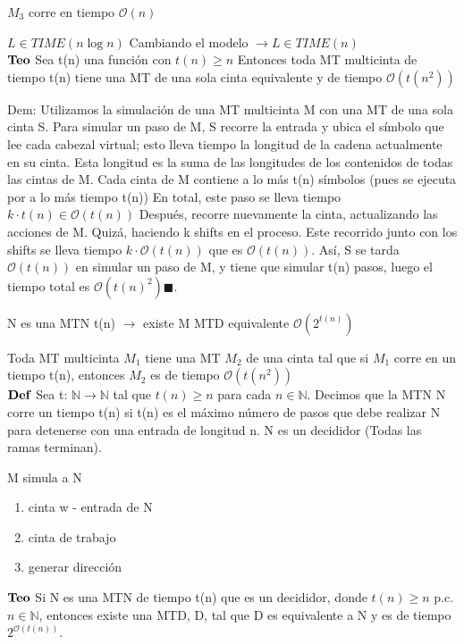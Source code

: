 \documentclass{homework}
\begin{document}
$M_3$ corre en tiempo $\mathcal{O}(n)$

$L \in TIME(n \log{n})$ 
Cambiando el modelo $\rightarrow L \in TIME(n)$\\

$\bf{Teo}$ Sea t(n) una función con $t(n) \geq n$
Entonces toda MT multicinta de tiempo t(n) tiene una MT de una sola cinta equivalente y de tiempo $\mathcal{O}(t(n^2))$

Dem: Utilizamos la simulación de una MT multicinta M con una MT de una sola cinta S.
Para simular un paso de M, S recorre la entrada y ubica el símbolo que lee cada cabezal virtual; esto lleva tiempo la longitud de la cadena actualmente en su cinta. Esta longitud es la suma de las longitudes de los contenidos de todas las cintas de M. Cada cinta de M contiene a lo más t(n) símbolos (pues se ejecuta por a lo más tiempo t(n)) En total, este paso se lleva tiempo $k \cdot t(n) \in \mathcal{O}(t(n))$
Después, recorre nuevamente la cinta, actualizando las acciones de M. Quizá, haciendo k shifts en el proceso. Este recorrido junto con los shifts se lleva tiempo $ k \cdot \mathcal{O}(t(n))$ que es $\mathcal{O}(t(n))$. Así, S se tarda $\mathcal{O}(t(n))$ en simular un paso de M, y tiene que simular t(n) pasos, luego el tiempo total es $\mathcal{O}(t(n)^2) \blacksquare$.

N es una MTN t(n) $\rightarrow$ existe M MTD equivalente $\mathcal{O}(2^{t(n)})$

Toda MT multicinta $M_1$ tiene una MT $M_2$ de una cinta tal que si $M_1$ corre en un tiempo t(n), entonces $M_2$ es de tiempo $\mathcal{O}(t(n^2))$\\

$\bf{Def}$ Sea t: $\mathds{N} \rightarrow \mathds{N}$ tal que $t(n) \geq n$ para cada $n \in \mathds{N}$. Decimos que la MTN N corre un tiempo t(n) si t(n) es el máximo número de pasos que debe realizar N para detenerse con una entrada de longitud n. N es un decididor (Todas las ramas terminan).

M simula a N
\begin{enumerate}
	\item cinta w - entrada de N
	\item cinta de trabajo
	\item generar dirección 
\end{enumerate}

$\bf{Teo}$ Si N es una MTN de tiempo t(n) que es un decididor, donde $t(n) \geq n$ p.c. $n \in \mathds{N}$, entonces existe una MTD, D, tal que D es equivalente a N y es de tiempo $2^{\mathcal{O}(t(n))}$.
\end{document}
